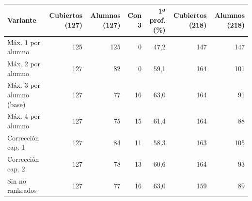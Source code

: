 \begin{tabular}{lrrrrrr}
\toprule
\textbf{Variante} & \textbf{Cubiertos (127)} & \textbf{Alumnos (127)} & \textbf{Con 3} & \textbf{1ª prof. (\%)} & \textbf{Cubiertos (218)} & \textbf{Alumnos (218)} \\
\midrule
Máx. 1 por alumno & 125 & 125 & 0 & 47,2 & 147 & 147 \\
Máx. 2 por alumno & 127 & 82 & 0 & 59,1 & 164 & 101 \\
Máx. 3 por alumno (base) & 127 & 77 & 16 & 63,0 & 164 & 91 \\
Máx. 4 por alumno & 127 & 75 & 15 & 61,4 & 164 & 88 \\
Corrección cap. 1 & 127 & 84 & 11 & 58,3 & 163 & 105 \\
Corrección cap. 2 & 127 & 78 & 13 & 60,6 & 164 & 93 \\
Sin no rankeados & 127 & 77 & 16 & 63,0 & 159 & 89 \\
\bottomrule
\end{tabular}
